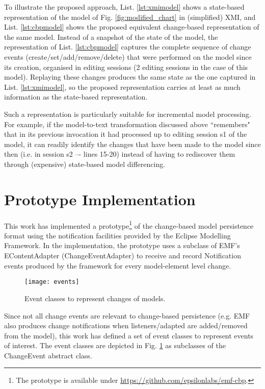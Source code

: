 To illustrate the proposed approach, List. \ref{lst:xmimodel} shows a state-based representation of the model of Fig. \ref{fig:modified_chart} in (simplified) XMI, and List. \ref{lst:cbpmodel} shows the proposed equivalent change-based representation of the same model. Instead of a snapshot of the state of the model, the representation of List. \ref{lst:cbpmodel} captures the complete sequence of change events (create/set/add/remove/delete) that were performed on the model since its creation, organised in editing sessions (2 editing sessions in the case of this model). Replaying these changes produces the same state as the one captured in List. \ref{lst:xmimodel}, so the proposed representation carries at least as much information as the state-based representation.

Such a representation is particularly suitable for incremental model processing. For example, if the model-to-text transformation discussed above ``remembers" that in its previous invocation it had processed up to editing session \textsf{s1} of the model, it can readily identify the changes that have been made to the model since then (i.e. in session \textsf{s2} –- lines 15-20) instead of having to rediscover them through (expensive) state-based model differencing.

\section{Prototype Implementation}
\label{sec:prototype_implementation}
This work has implemented a prototype\footnote{The prototype is available under \url{https://github.com/epsilonlabs/emf-cbp}.} of the change-based model persistence format using the notification facilities provided by the Eclipse Modelling Framework. In the implementation, the prototype uses a subclass of EMF's \textsf{EContentAdapter} (\textsf{ChangeEventAdapter}) to receive and record \textsf{Notification} events produced by the framework for every model-element level change.

\begin{figure}[th]
    \centering
    \texttt{[image: events]}
    \caption{Event classes to represent changes of models.}
    \label{fig:events}
\end{figure}

Since not all change events are relevant to change-based persistence (e.g. EMF also produces change notifications when listeners/adapted are added/removed from the model), this work has defined a set of event classes to represent events of interest. The event classes are depicted in Fig. \ref{fig:events} as subclasses of the \textsf{ChangeEvent} abstract class.

